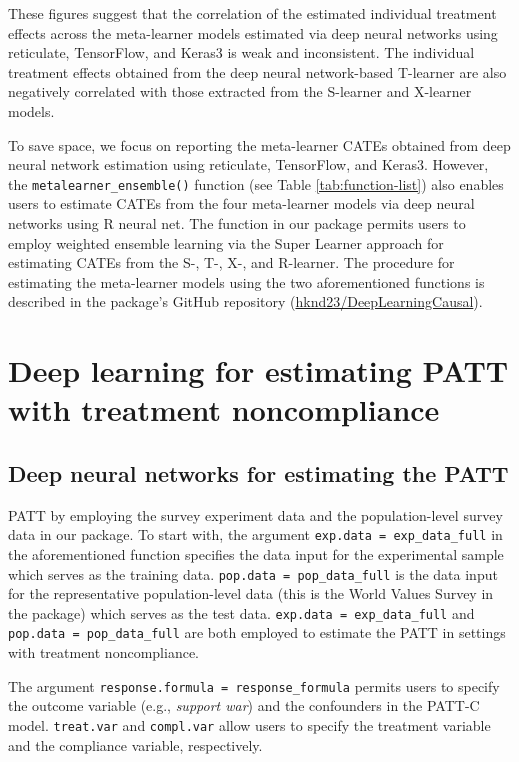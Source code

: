 These figures suggest that the correlation of the estimated individual
treatment effects across the meta-learner models estimated via deep
neural networks using reticulate, TensorFlow, and Keras3 is weak and
inconsistent. The individual treatment effects obtained from the deep
neural network-based T-learner are also negatively correlated with those
extracted from the S-learner and X-learner models.

To save space, we focus on reporting the meta-learner CATEs obtained
from deep neural network estimation using reticulate, TensorFlow, and
Keras3. However, the \texttt{metalearner\_ensemble()} function (see Table \ref{tab:function-list}) also enables users to estimate CATEs
from the four meta-learner models via deep neural networks using R
neural net. The function in our package permits users to employ weighted
ensemble learning via the Super Learner approach for estimating CATEs
from the S-, T-, X-, and R-learner. The procedure for estimating the
meta-learner models using the two aforementioned functions is described
in the package's GitHub repository
(\href{https://github.com/hknd23/DeepLearningCausal}{hknd23/DeepLearningCausal}).

\section{Deep learning for estimating PATT with treatment noncompliance}\label{deep-learning-for-estimating-patt-with-treatment-noncompliance}

\subsection{Deep neural networks for estimating the PATT}\label{deep-neural-networks-for-estimating-the-patt}

PATT by employing the survey experiment data and the population-level
survey data in our package. To start with, the argument
\texttt{exp.data\ =\ exp\_data\_full} in the aforementioned function specifies the
data input for the experimental sample which serves as the training
data. \texttt{pop.data\ =\ pop\_data\_full} is the data input for the
representative population-level data (this is the World Values Survey in
the package) which serves as the test data. \texttt{exp.data\ =\ exp\_data\_full}
and \texttt{pop.data\ =\ pop\_data\_full} are both employed to estimate the PATT in
settings with treatment noncompliance.

The argument \texttt{response.formula\ =\ response\_formula} permits users to
specify the outcome variable (e.g., \emph{support war}) and the confounders
in the PATT-C model. \texttt{treat.var} and \texttt{compl.var} allow users to specify
the treatment variable and the compliance variable, respectively.

